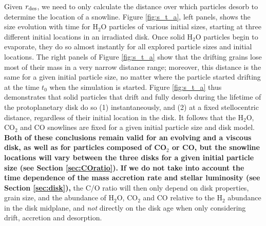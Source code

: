 \documentclass[apj]{emulateapj}
\newcommand{\emgr}[1]{\emph{ \color{gray} #1}}
\begin{document}
Given $r_{\rm des}$, we need to only calculate the distance over which particles desorb to determine the location of a snowline. Figure \ref{fig:s_t_a}, left panels, shows the size evolution with time for H$_2$O particles of various initial sizes, starting at three different initial locations in an irradiated disk. Once solid H$_2$O particles begin to evaporate, they do so almost instantly for all explored particle sizes and initial locations. %
The right panels of Figure \ref{fig:s_t_a} show that the drifting grains lose most of their mass in a very narrow distance range; moreover, this distance is the same for a given initial particle size, no matter where the particle started drifting at the time $t_0$ when the simulation is started. Figure \ref{fig:s_t_a} thus demonstrates that solid particles that drift and fully desorb during the lifetime of the protoplanetary disk do so (1) instantaneously, and (2) at a fixed stellocentric distance, regardless of their initial location in the disk. 
It follows that the H$_2$O, CO$_2$ and CO snowlines are fixed for a given initial particle size and disk model. \textbf{Both of these conclusions remain valid for an evolving and a viscous disk, as well as for particles composed of CO$_2$ or CO, but the snowline locations will vary between the three disks for a given initial particle size (see Section \ref{sec:COratio}).} \textbf{If we do not take into account the time dependence of the mass accretion rate and stellar luminosity (see Section \ref{sec:disk}),} the C/O ratio will then only depend on disk properties, grain size, and the abundance of H$_2$O, CO$_2$ and CO relative to the H$_2$ abundance in the disk midplane, and {\it not} directly on the disk age when only considering drift, accretion and desorption.  %



\end{document}
